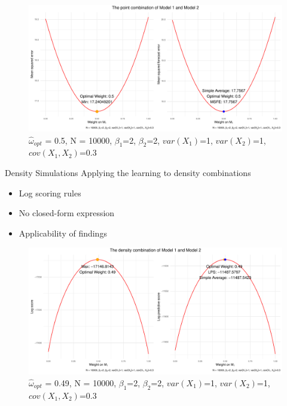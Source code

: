 \begin{frame}[plain]
    \begin{figure}
        \centering
        \includegraphics[scale=0.55]{Graph/MSFE.pdf}
        \caption{\footnotesize{$\hat\omega_{opt}$ = 0.5, \alert{N = 10000}, $\beta_1$=2, $\beta_2$=2, $var(X_1)$=1, $var(X_2)$=1, $cov(X_1,X_2)$=0.3}}
    \end{figure}
\end{frame}



\begin{frame}{Density Simulations}
    Applying the learning to density combinations 
    
    \begin{itemize}
        \item Log scoring rules
        \item No closed-form expression
        \item Applicability of findings
    \end{itemize}

\end{frame}



\begin{frame}[plain]
    \begin{figure}
        \centering
        \includegraphics[scale=0.55]{Graph/LPS_10000.pdf}
        \caption{\footnotesize{$\hat\omega_{opt}$ = 0.49, N = 10000, $\beta_1$=2, $\beta_2$=2, $var(X_1)$=1, $var(X_2)$=1, $cov(X_1,X_2)$=0.3}}
    \end{figure}
\end{frame}



